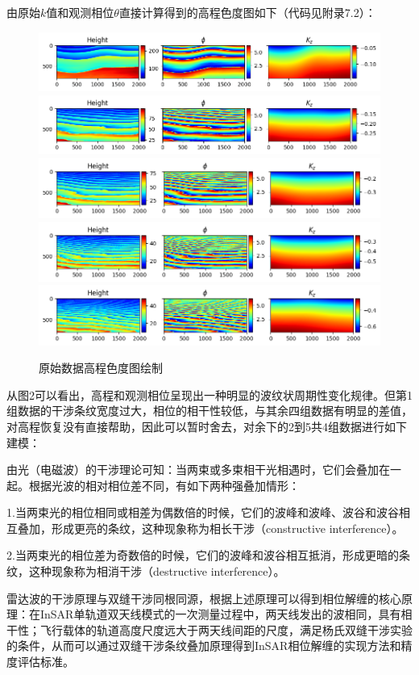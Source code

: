 \documentclass[a4paper]{article}
\begin{document}
	由原始$ k $值和观测相位$ \theta $直接计算得到的高程色度图如下（代码见附录7.2）：\par
	
	\begin{figure}[H]
		\centering
		\includegraphics[width=1.01\textwidth]{images/raw/raw_1.png}
		\includegraphics[width=1.01\textwidth]{images/raw/raw_2.png}
		\includegraphics[width=1\textwidth]{images/raw/raw_3.png}
		\includegraphics[width=1\textwidth]{images/raw/raw_4.png}
		\includegraphics[width=1\textwidth]{images/raw/raw_5.png}
		
		\caption{原始数据高程色度图绘制}
		\label{fig:raw_1}
	\end{figure}

	从图2可以看出，高程和观测相位呈现出一种明显的波纹状周期性变化规律。但第1组数据的干涉条纹宽度过大，相位的相干性较低，与其余四组数据有明显的差值，对高程恢复没有直接帮助，因此可以暂时舍去，对余下的2到5共4组数据进行如下建模：\par
	由光（电磁波）的干涉理论可知：当两束或多束相干光相遇时，它们会叠加在一起。根据光波的相对相位差不同，有如下两种强叠加情形：\par
	1.当两束光的相位相同或相差为偶数倍的时候，它们的波峰和波峰、波谷和波谷相互叠加，形成更亮的条纹，这种现象称为相长干涉（constructive interference）。\par
	2.当两束光的相位差为奇数倍的时候，它们的波峰和波谷相互抵消，形成更暗的条纹，这种现象称为相消干涉（destructive interference）。\par
	雷达波的干涉原理与双缝干涉同根同源，根据上述原理可以得到相位解缠的核心原理：在InSAR单轨道双天线模式的一次测量过程中，两天线发出的波相同，具有相干性；飞行载体的轨道高度尺度远大于两天线间距的尺度，满足杨氏双缝干涉实验的条件，从而可以通过双缝干涉条纹叠加原理得到InSAR相位解缠的实现方法和精度评估标准。\par
\end{document}
